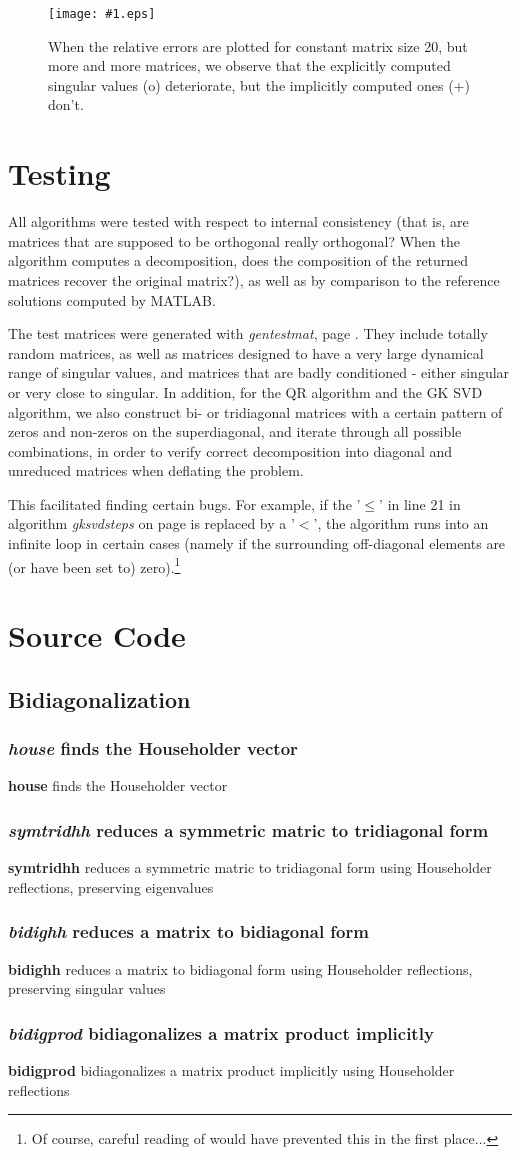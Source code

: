 \documentclass[11pt]{article}
\newcommand{\readcode}[3]
{
	\subsubsection{\emph{#1} #2}
	\textbf{#1} #2 #3}, label={rc:#1}]{#1.m}
}
\newcommand{\mypic}[2]
{
\begin{figure}[tbhp] 
       \centering
	\texttt{[image: \#1.eps]}
       \caption{\label{f:#1}#2}
 \end{figure} 
}
\begin{document}
\mypic{re2KKKN20}{When the relative errors are plotted for constant matrix size 20, but more and more matrices, we observe that the explicitly computed singular values (o) deteriorate, but the implicitly computed ones (+) don't.} 

\section{Testing}
All algorithms were tested with respect to internal consistency (that is, are matrices that are supposed to be orthogonal really orthogonal? When the algorithm computes a decomposition, does the composition of the returned matrices recover the original matrix?), as well as by comparison to the reference solutions computed by MATLAB. 

The test matrices were generated with \emph{gentestmat}, page \pageref{rc:gentestmat}. They include totally random matrices, as well as matrices designed to have a very large dynamical range of singular values, and matrices that are badly conditioned - either singular or very close to singular. In addition, for the QR algorithm and the GK SVD algorithm, we also construct bi- or tridiagonal matrices with a certain pattern of zeros and non-zeros on the superdiagonal, and iterate through all possible combinations, in order to verify correct decomposition into diagonal and unreduced matrices when deflating the problem.

This facilitated finding certain bugs. For example, if the '$\le$' in line 21 in algorithm \emph{gksvdsteps} on page \pageref{rc:gksvdsteps} is replaced by a '$<$', the algorithm runs into an infinite loop in certain cases (namely if the surrounding off-diagonal elements are (or have been set to) zero).\footnote{Of course, careful reading of \cite[page 455]{GolL96} would have prevented this in the first place...}

\appendix
\newpage
\section{Source Code}

\subsection{Bidiagonalization}
\readcode{house}{finds the Householder vector}{}
\readcode{symtridhh}{reduces a symmetric matric to tridiagonal form}{using Householder reflections, preserving eigenvalues}
\readcode{bidighh}{reduces a matrix to bidiagonal form}{using Householder reflections, preserving singular values}
\readcode{bidigprod}{bidiagonalizes a matrix product implicitly}{using Householder reflections}
\end{document}
